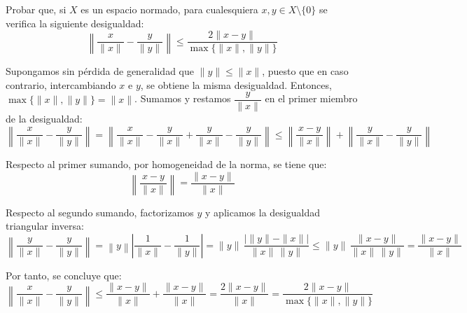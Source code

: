 \begin{ejercicio}
Probar que, si $X$ es un espacio normado, para cualesquiera $x, y \in X \setminus \{0\}$ se verifica la siguiente desigualdad:
\[
\left\| \frac{x}{\|x\|} - \frac{y}{\|y\|} \right\| \leq \frac{2\|x - y\|}{\max\{\|x\|, \|y\|\}}
\]

    Supongamos sin pérdida de generalidad que $\|y\| \leq \|x\|$, puesto que en caso contrario, intercambiando $x$ e $y$, se obtiene la misma desigualdad. Entonces, $\max\{\|x\|, \|y\|\} = \|x\|$. Sumamos y restamos $\dfrac{y}{\|x\|}$ en el primer miembro de la desigualdad:
    \begin{equation*}
        \left\| \frac{x}{\|x\|} - \frac{y}{\|y\|} \right\| = \left\| \frac{x}{\|x\|} - \frac{y}{\|x\|} + \frac{y}{\|x\|} - \frac{y}{\|y\|} \right\| \leq \left\| \frac{x - y}{\|x\|} \right\| + \left\| \dfrac{y}{\|x\|} - \dfrac{y}{\|y\|} \right\|
    \end{equation*}

    Respecto al primer sumando, por homogeneidad de la norma, se tiene que:
    \begin{equation*}
        \left\| \frac{x - y}{\|x\|} \right\| = \frac{\|x - y\|}{\|x\|}
    \end{equation*}

    Respecto al segundo sumando, factorizamos $y$ y aplicamos la desigualdad triangular inversa:
    \begin{equation*}
        \left\| \dfrac{y}{\|x\|} - \dfrac{y}{\|y\|} \right\| = \left\|y\right\| \left| \frac{1}{\|x\|} - \frac{1}{\|y\|} \right| = \|y\| \, \frac{|\|y\| - \|x\||}{\|x\| \, \|y\|} \leq \|y\| \,  \frac{\|x - y\|}{\|x\| \, \|y\|} = \frac{\|x - y\|}{\|x\|}
    \end{equation*}

    Por tanto, se concluye que:
    \begin{equation*}
        \left\| \frac{x}{\|x\|} - \frac{y}{\|y\|} \right\| \leq \frac{\|x - y\|}{\|x\|} + \frac{\|x - y\|}{\|x\|} = \frac{2\|x - y\|}{\|x\|} = \frac{2\|x - y\|}{\max\{\|x\|, \|y\|\}}
    \end{equation*}
\end{ejercicio}


